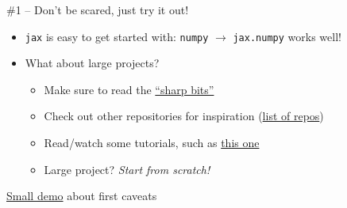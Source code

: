 \documentclass[usenames,dvipsnames,t]{beamer}
\begin{document}
\begin{frame}{\#1 -- Don't be scared, just try it out!}

  \def\x{6mm}

  \begin{itemize}
    \item \texttt{jax} is easy to get started with: \texttt{numpy} $\rightarrow$ \texttt{jax.numpy} works well!
    
    \vspace{\x}

    \item What about large projects?
    
    \begin{itemize}
      \vspace{\x}

      \item Make sure to read the \href{https://jax.readthedocs.io/en/latest/notebooks/Common_Gotchas_in_JAX.html}{``sharp bits''} \
      
      \vspace{\x}

      \item Check out other repositories for inspiration (\href{https://github.com/n2cholas/awesome-jax}{list of repos})

      \vspace{\x}
      
      \item Read/watch some tutorials, such as \href{https://github.com/gordicaleksa/get-started-with-JAX}{this one}
      
      \vspace{\x}
      
      \item Large project? \textit{Start from scratch!}
      

      

      

    \end{itemize}
  \end{itemize}

  \vspace{3mm}

  \href{https://github.com/ThibeauWouters/jax-getting-started/blob/main/jax-getting-started.ipynb}{Small demo} about first caveats
  
\end{frame}
\end{document}
